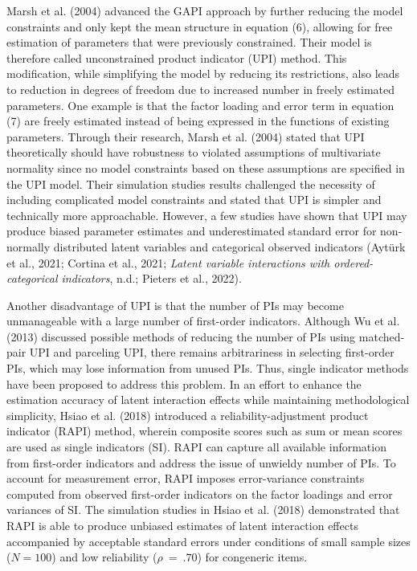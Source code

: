 \documentclass[
  11pt,
  man]{apa6}
\begin{document}
Marsh et al. (2004) advanced the GAPI approach by further reducing the model constraints and only kept the mean structure in equation (6), allowing for free estimation of parameters that were previously constrained. Their model is therefore called unconstrained product indicator (UPI) method. This modification, while simplifying the model by reducing its restrictions, also leads to reduction in degrees of freedom due to increased number in freely estimated parameters. One example is that the factor loading and error term in equation (7) are freely estimated instead of being expressed in the functions of existing parameters. Through their research, Marsh et al. (2004) stated that UPI theoretically should have robustness to violated assumptions of multivariate normality since no model constraints based on these assumptions are specified in the UPI model. Their simulation studies results challenged the necessity of including complicated model constraints and stated that UPI is simpler and technically more approachable. However, a few studies have shown that UPI may produce biased parameter estimates and underestimated standard error for non-normally distributed latent variables and categorical observed indicators (Aytürk et al., 2021; Cortina et al., 2021; \emph{Latent {variable interactions with ordered-categorical indicators}}, n.d.; Pieters et al., 2022).

Another disadvantage of UPI is that the number of PIs may become unmanageable with a large number of first-order indicators. Although Wu et al. (2013) discussed possible methods of reducing the number of PIs using matched-pair UPI and parceling UPI, there remains arbitrariness in selecting first-order PIs, which may lose information from unused PIs. Thus, single indicator methods have been proposed to address this problem. In an effort to enhance the estimation accuracy of latent interaction effects while maintaining methodological simplicity, Hsiao et al. (2018) introduced a reliability-adjustment product indicator (RAPI) method, wherein composite scores such as sum or mean scores are used as single indicators (SI). RAPI can capture all available information from first-order indicators and address the issue of unwieldy number of PIs. To account for measurement error, RAPI imposes error-variance constraints computed from observed first-order indicators on the factor loadings and error variances of SI. The simulation studies in Hsiao et al. (2018) demonstrated that RAPI is able to produce unbiased estimates of latent interaction effects accompanied by acceptable standard errors under conditions of small sample sizes (\(N = 100\)) and low reliability (\(\rho \ = \ .70\)) for congeneric items.
\end{document}
